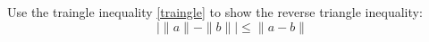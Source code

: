 \documentclass[openany]{book}
\begin{document}
\begin{prob}
    Use the traingle inequality \ref{traingle} to show the reverse triangle inequality:
    \begin{equation*}
        \bigg|\|a\|-\|b\|\bigg|\leq\|a-b\|
    \end{equation*}
\end{prob}
\end{document}

